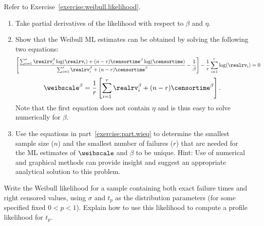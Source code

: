 \begin{exercise1}
Refer to Exercise~\ref{exercise:weibull.likelihood}. 
\begin{enumerate}
\item
Take partial derivatives of the likelihood with respect to 
$\beta$ and $\eta$.
\item
Show that the Weibull ML estimates can be obtained by solving the
following two equations:
\begin{displaymath}
\label{exercise:part.wieq}
\left[ \frac{
\sum_{i=1}^{r} \realrv_{i}^{\beta} \log(\realrv_{i}) +
(n-r)\censortime^{\beta}\log(\censortime)} {\sum_{i=1}^{r}
\realrv_{i}^{\beta} + (n-r) \censortime^{\beta} } - \frac{1}{\beta}
\right] - \frac{1}{r} \sum_{i=1}^{r} \log(\realrv_{i}) =0
\end{displaymath}
\begin{displaymath}
\weibscale^\beta = \frac{1}{r} \left[ \sum_{i=1}^{r} \realrv_{i}^{\beta} +
(n-r) \censortime^{\beta}
\right] .
\end{displaymath}
Note that the first equation does not contain $\eta$ and is thus easy to
solve numerically for $\beta$.
\item
Use the equations in part~\ref{exercise:part.wieq} to determine the
smallest sample size ($n$) and the smallest number of failures ($r$)
that are needed for the ML estimates of $\weibscale$ and $\beta$ to be
unique.  Hint: Use of numerical and graphical methods can provide
insight and suggest an
appropriate analytical solution to this problem.
\end{enumerate}
\end{exercise1}


\begin{exercise}
Write the Weibull likelihood for a sample 
containing both exact failure times and right censored values, using
$\sigma$ and $t_{p}$ as the distribution parameters (for some
specified fixed $0<p<1$). Explain how to use this likelihood to
compute a profile likelihood for $t_{p}$.
\end{exercise}

